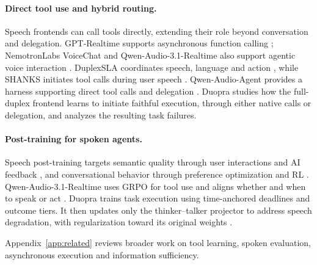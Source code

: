 \paragraph{Direct tool use and hybrid routing.}
Speech frontends can call tools directly, extending their role beyond conversation and delegation.
GPT-Realtime supports asynchronous function calling \citep{openai2025gptrealtime}; NemotronLabs VoiceChat and Qwen-Audio-3.1-Realtime also support agentic voice interaction \citep{nemotronlabs2026voicechat,bao2026qwenaudio31}.
DuplexSLA coordinates speech, language and action \citep{zhang2026duplexsla}, while SHANKS initiates tool calls during user speech \citep{chiang2025shanks}.
Qwen-Audio-Agent provides a harness supporting direct tool calls and  delegation \citep{deng2026qwenaudioagent}.
Duopra studies how the full-duplex frontend learns to initiate faithful execution, through either native calls or delegation, and analyzes the resulting task failures.

\paragraph{Post-training for spoken agents.}
Speech post-training targets semantic quality through user interactions and AI feedback \citep{wu2025aligning,lin2025alignslm}, and conversational behavior through preference optimization \citep{fang2026baylingduplex} and RL \citep{ohashi2026multifaceted,hsiao2026aspirin,li2026duplexpo}.
Qwen-Audio-3.1-Realtime uses GRPO for tool use and aligns
whether and when to speak or act \citep{bao2026qwenaudio31}.
Duopra trains task execution using time-anchored deadlines
and outcome tiers.
It then updates only the thinker--talker projector to address speech degradation, with regularization toward its original weights \citep{li2018explicit}.

Appendix~\ref{app:related} reviews broader work on tool learning, spoken evaluation, asynchronous execution and information sufficiency.
